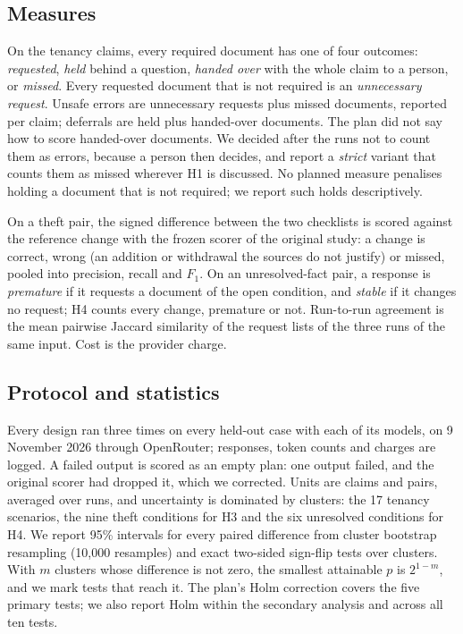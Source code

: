 \subsection{Measures}
\label{sec:measures}

On the tenancy claims, every required document has one of four outcomes: \emph{requested}, \emph{held} behind a question, \emph{handed over} with the whole claim to a person, or \emph{missed}. Every requested document that is not required is an \emph{unnecessary request}. Unsafe errors are unnecessary requests plus missed documents, reported per claim; deferrals are held plus handed-over documents. The plan did not say how to score handed-over documents. We decided after the runs not to count them as errors, because a person then decides, and report a \emph{strict} variant that counts them as missed wherever H1 is discussed. No planned measure penalises holding a document that is not required; we report such holds descriptively.

On a theft pair, the signed difference between the two checklists is scored against the reference change with the frozen scorer of the original study: a change is correct, wrong (an addition or withdrawal the sources do not justify) or missed, pooled into precision, recall and $F_1$. On an unresolved-fact pair, a response is \emph{premature} if it requests a document of the open condition, and \emph{stable} if it changes no request; H4 counts every change, premature or not. Run-to-run agreement is the mean pairwise Jaccard similarity of the request lists of the three runs of the same input. Cost is the provider charge.

\subsection{Protocol and statistics}
\label{sec:protocol}

Every design ran three times on every held-out case with each of its models, on 9 November 2026 through OpenRouter; responses, token counts and charges are logged. A failed output is scored as an empty plan: one  output failed, and the original scorer had dropped it, which we corrected. Units are claims and pairs, averaged over runs, and uncertainty is dominated by clusters: the 17 tenancy scenarios, the nine theft conditions for H3 and the six unresolved conditions for H4. We report 95\% intervals for every paired difference from cluster bootstrap resampling (10,000 resamples) and exact two-sided sign-flip tests over clusters. With $m$ clusters whose difference is not zero, the smallest attainable $p$ is $2^{1-m}$, and we mark tests that reach it. The plan's Holm correction covers the five primary tests; we also report Holm within the secondary analysis and across all ten tests.

